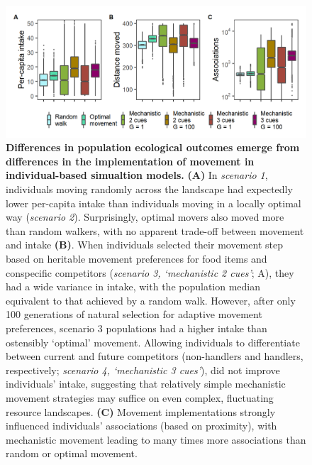 \begin{figure}[!h]
    \centering
    \includegraphics[width=0.95\linewidth]{figures/introduction/fig_cs_2_1.png}
    \caption{
        \textbf{Differences in population ecological outcomes emerge from differences in the implementation of movement in individual-based simualtion models.}
        \textbf{(A)} In \textit{scenario 1}, individuals moving randomly across the landscape had expectedly lower per-capita intake than individuals moving in a locally optimal way (\textit{scenario 2}).
        Surprisingly, optimal movers also moved more than random walkers, with no apparent trade-off between movement and intake \textbf{(B)}.
        When individuals selected their movement step based on heritable movement preferences for food items and conspecific competitors (\textit{scenario 3, `mechanistic 2 cues'}; A), they had a wide variance in intake, with the population median equivalent to that achieved by a random walk.
        However, after only 100 generations of natural selection for adaptive movement preferences, scenario 3 populations had a higher intake than ostensibly `optimal' movement.
        Allowing individuals to differentiate between current and future competitors (non-handlers and handlers, respectively; \textit{scenario 4, `mechanistic 3 cues'}), did not improve individuals' intake, suggesting that relatively simple mechanistic movement strategies may suffice on even complex, fluctuating resource landscapes.
        \textbf{(C)} Movement implementations strongly influenced individuals' associations (based on proximity), with mechanistic movement leading to many times more associations than random or optimal movement.
    }
    \label{fig:compare}
    \end{figure}

